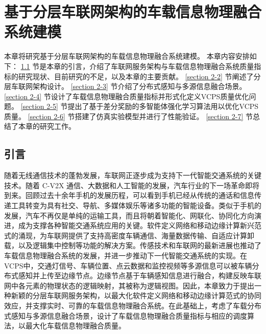 \chapter[\hspace{0pt}基于分层车联网架构的车载信息物理融合系统建模]{{\hspace{-5pt}基于分层车联网架构的车载信息物理融合系统建模}}
\removelofgap
\removelotgap
本章将研究基于分层车联网架构的车载信息物理融合系统建模。
本章内容安排如下：
\ref{section 2-1} 节是本章的引言，介绍了车联网服务架构与车载信息物理融合系统质量指标的研究现状、目前研究的不足，以及本章的主要贡献。
\ref{section 2-2} 节阐述了分层车联网架构设计。
\ref{section 2-3} 节介绍了分布式感知与多源信息融合场景。
\ref{section 2-4} 节设计了车载信息物理融合质量指标并形式化定义VCPS质量优化问题。
\ref{section 2-5} 节提出了基于差分奖励的多智能体强化学习算法用以优化VCPS质量。
\ref{section 2-6} 节搭建了仿真实验模型并进行了性能验证。
\ref{section 2-7} 节总结了本章的研究工作。

\section[\hspace{-2pt}引言]{{ \hspace{-8pt}引言}}\label{section 2-1}

随着无线通信技术的蓬勃发展，车联网正逐步成为支持下一代智能交通系统的关键技术。随着 C-V2X 通信、大数据和人工智能的发展，汽车行业的下一场革命即将到来。回顾过去十余年手机的发展历程，可以看到手机已经从传统的通话和信息传递工具转变为具有社交、导航、多媒体娱乐等诸多功能的智能设备。类似于手机的发展，汽车不再仅是单纯的运输工具，而且将朝着智能化、网联化、协同化方向演进，成为支撑各种智能交通系统应用的关键。软件定义网络\cite{li2021zhi}和移动边缘计算\cite{liu2022fedcpf}新兴范式的涌现，为车联网提供了支持高密度车辆通信、海量数据传输、自适应计算卸载，以及逻辑集中控制等功能的解决方案。传感技术和车联网的最新进展也推动了车载信息物理融合系统的发展，并进一步推动下一代智能交通系统的实现。在VCPS中，交通灯信号、车辆位置、点云数据和监控视频等多源信息可以被车辆分布式感知并上传至边缘节点。边缘节点基于车辆感知信息进行融合，构建反映车联网中各元素的物理状态的逻辑映射，其被称为逻辑视图。因此，本章致力于提出一种新颖的分层车联网服务架构，以最大化软件定义网络和移动边缘计算范式的协同效应，并支撑实时、可靠的车载信息物理融合系统。在此基础上，考虑了车载分布式感知与多源信息融合场景，设计了车载信息物理融合质量指标与相应的调度算法，以最大化车载信息物理融合质量。

